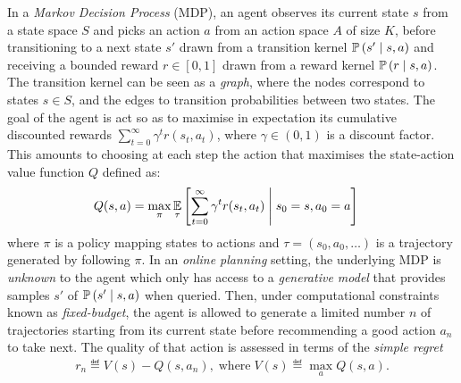 \documentclass[runningheads]{llncs}
\begin{document}
In a \emph{Markov Decision Process} (MDP), an agent observes its current state $s$ from a state space $S$ and picks an action $a$ from an action space $A$ of size $K$, before transitioning to a next state $s'$ drawn from a transition kernel $\mathbb{P}\left(s'\;\middle|\; s,a\right)$ and receiving a bounded reward $r\in[0, 1]$ drawn from a reward kernel $\mathbb{P}\left(r \;\middle|\; s, a\right)$. The transition kernel can be seen as a \emph{graph}, where the nodes correspond to states $s\in S$, and the edges to transition probabilities between two states. The goal of the agent is act so as to maximise in expectation its cumulative discounted rewards $\sum_{t=0}^\infty \gamma^t r(s_t, a_t)$, where $\gamma\in(0, 1)$ is a discount factor. This amounts to choosing at each step the action that maximises the state-action value function $Q$ defined as:
\begin{align*}
Q(s, a) &= \max_\pi  \operatorname*{\mathbb{E}}_\tau \left[\sum_{t=0}^\infty \gamma^t r(s_t, a_t)\;\middle|\; s_0 = s, a_0 = a\right]
\end{align*}
where $\pi$ is a policy mapping states to actions and $\tau = (s_0, a_0, \dots)$ is a trajectory generated by following $\pi$. In an \emph{online planning} setting, the underlying MDP is \emph{unknown} to the agent which only has access to a \emph{generative model} that provides samples $s'$ of $\mathbb{P}\left(s' \;\middle|\; s, a\right)$ when queried. Then, under computational constraints known as \emph{fixed-budget}, the agent is allowed to generate a limited number $n$ of trajectories starting from its current state before recommending a good action $a_n$ to take next.
The quality of that action is assessed in terms of the \emph{simple regret}
\begin{align}
	r_n \eqdef V(s) - Q(s, {a}_n), \; \mbox{where} \; V(s) \eqdef  \max_a Q(s, a).
\end{align}
\end{document}
